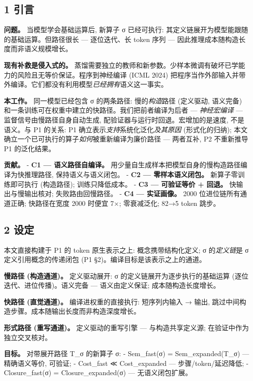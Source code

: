 \documentclass[
]{article}
\begin{document}
\subsection{1 引言}\label{ux5f15ux8a00}

\textbf{问题。} 当模型学会基础运算后, 新算子 σ 已经可执行:
其定义链展开为模型能跟随的基础运算。但路径很长 --- 逐位迭代、长 token
序列 --- 因此推理成本随构造长度而非语义规模增长。

\textbf{现有补救是侵入式的。}
蒸馏需要独立的教师和新参数。少样本微调有破坏已学能力的风险且无等价保证。程序到神经编译
(ICML 2024)
把程序当作外部输入并带外编译。它们都没有利用模型\emph{已经拥有}语义这一事实。

\textbf{本工作。} 同一模型已经包含 σ 的两条路径: 慢的\emph{构造}路径
(定义驱动, 语义完备)
和一条训练可在权重中建立的快路径。我们把前者编译为后者 ---
\emph{神经宏编译} --- 监督信号由慢路径自身自动生成,
配验证器与运行时回退。宏增加的是速度, 不是语义。与 P1 的关系: P1
确立表示\emph{支持}系统化泛化\emph{及其原因} (形式化的归纳);
本文确立一个已可执行的算子\emph{如何}被重新编译为廉价路径 --- 两者互补,
P2 不重新推导 P1 的泛化结果。

\textbf{贡献。} - \textbf{C1 --- 语义路径自编译。}
用少量自生成样本把模型自身的慢构造路径编译为快推理路径,
保持语义与语义闭包。 - \textbf{C2 --- 零样本语义闭包。}
新算子零训练即可执行 (构造路径); 训练只降低成本。 - \textbf{C3 ---
可验证等价 + 回退。} 快输出与慢输出核对; 失败路由回慢路径。 - \textbf{C4
--- 实证画像。} 2000 位进位链所有通道正确; 快路径在宽度 2000 时便宜 7×;
零衰减泛化; 82→5 token 跳步。

\subsection{2 设定}\label{ux8bbeux5b9a}

本文直接构建于 P1 的 token 原生表示之上: 概念携带结构化定义; σ
的\emph{定义链}是 σ 定义引用概念的传递闭包 (P1
§2)。编译目标是该表示之上的通道。

\textbf{慢路径 (构造通道)。} 定义驱动展开: σ
的定义链展开为逐步执行的基础运算 (逐位迭代、进位传播)。语义完备 ---
语义由定义保证; 成本随构造长度增长。

\textbf{快路径 (直觉通道)。} 编译进权重的直接执行: 短序列内输入 → 输出,
跳过中间构造步骤。成本随输出长度而非构造深度增长。

\textbf{形式路径 (重写通道)。} 定义驱动的重写引擎 --- 与构造共享定义源;
在验证中作为独立交叉核对。

\textbf{目标。} 对带展开路径 T\_σ 的新算子 σ: - Sem\_fast(σ) =
Sem\_expanded(T\_σ) --- 精确语义等价, 可验证; - Cost\_fast ≪
Cost\_expanded --- 步骤/token/延迟降低; - Closure\_fast(σ) =
Closure\_expanded(σ) --- 无语义闭包扩展。
\end{document}
